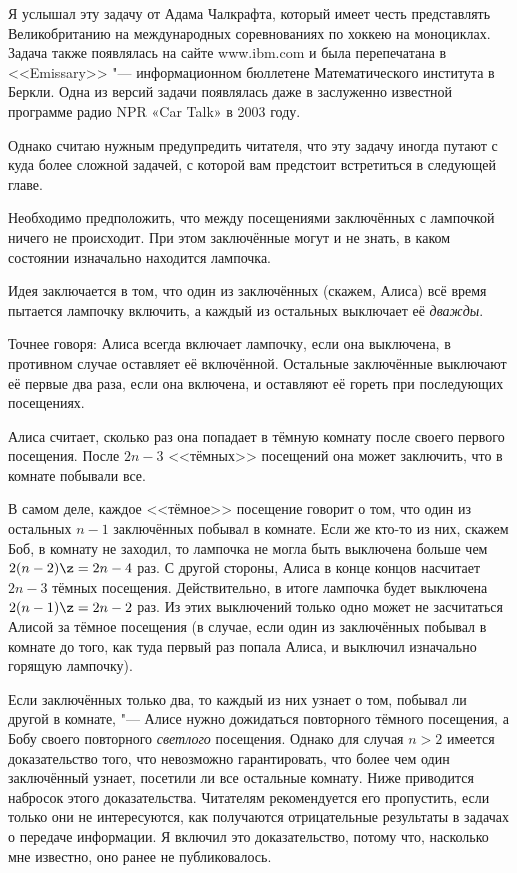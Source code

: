 \documentclass[twoside]{book}
\begin{document}
Я услышал эту задачу от Адама Чалкрафта, %
который имеет честь представлять Великобританию на международных
соревнованиях по хоккею на моноциклах.
Задача также появлялась на сайте www.ibm.com и была перепечатана в <<Emissary>> "--- информационном бюллетене Математического института в Беркли. %
Одна из версий задачи появлялась даже в заслуженно известной программе
радио NPR «Car Talk» в 2003 году.

Однако считаю нужным предупредить читателя, что эту задачу иногда путают с куда более сложной задачей, с которой вам предстоит встретиться в следующей главе.

\medskip

Необходимо предположить, что между посещениями заключённых
с лампочкой ничего не происходит. При этом
заключённые могут и не знать, в каком состоянии изначально находится лампочка.

Идея заключается в том, что один из заключённых (скажем, Алиса) всё время пытается лампочку включить, а каждый из остальных выключает её \emph{дважды}.

Точнее говоря: Алиса всегда включает лампочку, если она выключена, в противном случае оставляет её включённой.
Остальные заключённые выключают её первые два раза, если она включена, и оставляют её гореть при последующих посещениях.

Алиса считает, сколько раз она попадает в тёмную комнату после своего первого 
посещения. После $2n-3$ <<тёмных>> посещений она может заключить, что в комнате побывали все.

В самом деле,
каждое <<тёмное>> посещение говорит о том, что один из остальных $n-1$ заключённых побывал в комнате.
Если же кто-то из них, скажем Боб, в комнату не заходил, то лампочка не могла быть выключена больше чем $2(n-2)\z=2n-4$ раз.
С другой стороны, Алиса в конце концов насчитает $2n-3$ тёмных посещения.
Действительно, в итоге лампочка будет выключена $2(n-1)\z=2n-2$
раз.
Из этих выключений только одно может не засчитаться Алисой за тёмное
посещения (в случае, если один из заключённых побывал в комнате до того,
как туда первый раз попала Алиса, и выключил изначально горящую лампочку).

Если заключённых только два, то каждый из них узнает о том, побывал ли другой в комнате, "---
Алисе нужно дожидаться повторного тёмного посещения, а Бобу своего повторного \emph{светлого} посещения.
Однако для случая $n>2$ имеется доказательство того, что невозможно гарантировать, что более чем один заключённый узнает, посетили ли все остальные комнату.
Ниже приводится набросок этого доказательства.
Читателям рекомендуется его пропустить, если только они не интересуются, как получаются отрицательные результаты в задачах о передаче информации.
Я включил это доказательство, потому что, насколько мне известно, оно
ранее не публиковалось.
{\par}
\end{document}
